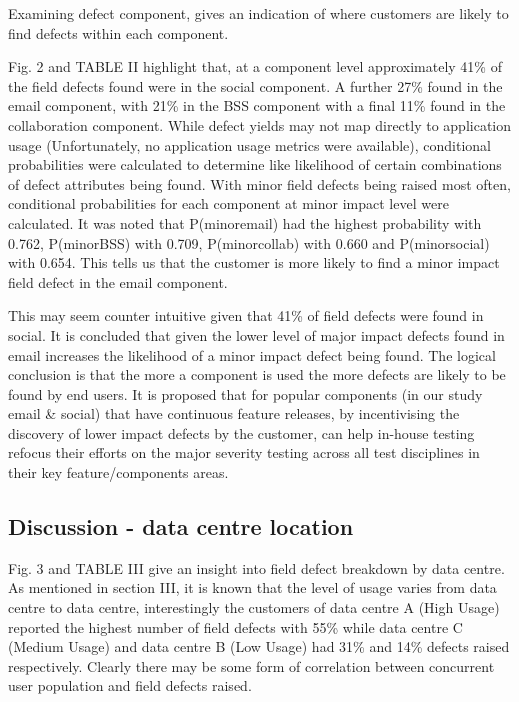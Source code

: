 Examining defect component, gives an indication of where customers are likely to find defects within each component. \par
Fig. 2 and TABLE II highlight that, at a component level approximately 41\% of the field defects found were in the social component. A further 27\% found in the email component, with 21\% in the BSS component with a final 11\% found in the collaboration component. While defect yields may not map directly to application usage (Unfortunately, no application usage metrics were available), conditional probabilities were calculated to determine like likelihood of certain combinations of defect attributes being found. With minor field defects being raised most often, conditional probabilities  for each component at minor impact level were calculated. It was noted that  P(minor\textbar email) had the highest probability with 0.762, P(minor\textbar BSS) with 0.709, P(minor\textbar collab) with 0.660 and P(minor\textbar social) with 0.654. This tells us that the customer is more likely to find a minor impact field defect in the email component. \par

This may seem counter intuitive given that 41\% of field defects were found in social. It is concluded that given the lower level of major impact defects found in email increases the likelihood of a minor impact defect being found.  The logical conclusion is that the more a component is used the more defects are likely to be found by end users. It is proposed that for popular components (in our study email \& social) that have continuous feature releases, by incentivising the discovery of lower impact defects by the customer, can help in-house testing refocus their efforts on the major severity testing across all test disciplines in their key feature/components areas. 

\subsection{Discussion - data centre location}
Fig. 3 and TABLE III give an insight into field defect breakdown by data centre. As mentioned in section III, it is known that the level of usage varies from data centre to data centre, interestingly the customers of data centre A (High Usage) reported the highest number of field defects with 55\% while data centre C (Medium Usage) and data centre B (Low Usage) had 31\% and 14\% defects raised respectively. Clearly there may be some form of correlation between concurrent user population and field defects raised. \par

